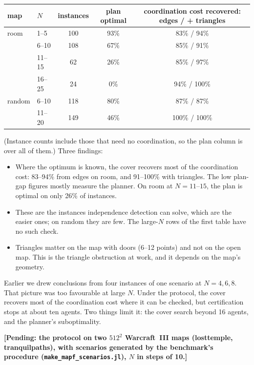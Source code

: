 \documentclass[11pt]{article}
\theoremstyle{definition}
\theoremstyle{remark}
\begin{document}
\begin{center}
\small
\begin{tabular}{llccc}
\toprule
map & $N$ & instances & plan optimal & coordination cost recovered: edges / + triangles \\
\midrule
room   & 1--5   & 100 & 93\% & 83\% / 94\% \\
       & 6--10  & 108 & 67\% & 85\% / 91\% \\
       & 11--15 & 62  & 26\% & 85\% / 97\% \\
       & 16--25 & 24  & 0\%  & 94\% / 100\% \\
\midrule
random & 6--10  & 118 & 80\% & 87\% / 87\% \\
       & 11--20 & 149 & 46\% & 100\% / 100\% \\
\bottomrule
\end{tabular}
\end{center}

\noindent (Instance counts include those that need no coordination, so the plan
column is over all of them.) Three findings:
\begin{itemize}[nosep]
\item Where the optimum is known, the cover recovers most of the coordination cost:
  83--94\% from edges on room, and 91--100\% with triangles. The low plan-gap
  figures mostly measure the planner. On room at $N = 11$--$15$, the plan is
  optimal on only 26\% of instances.
\item These are the instances independence detection can solve, which are the
  easier ones; on random they are few. The large-$N$ rows of the first table have no
  such check.
\item Triangles matter on the map with doors (6--12 points) and not on the open map.
  This is the triangle obstruction at work, and it depends on the map's geometry.
\end{itemize}
Earlier we drew conclusions from four instances of one scenario at $N = 4, 6, 8$.
That picture was too favourable at large $N$. Under the protocol, the cover
recovers most of the coordination cost where it can be checked, but certification
stops at about ten agents. Two things limit it: the cover search beyond 16 agents,
and the planner's suboptimality.

\textbf{[Pending: the protocol on two $512^2$ Warcraft~III maps (losttemple,
tranquilpaths), with scenarios generated by the benchmark's procedure
(\texttt{make\_mapf\_scenarios.jl}), $N$ in steps of 10.]}
\end{document}
